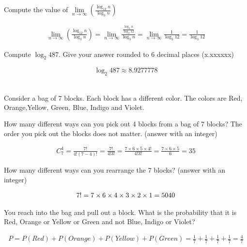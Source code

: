 \documentclass[12pt]{article}
\newenvironment{sol}[1][Solution]{\begin{trivlist}
\item[\hskip\labelsep {\bfseries #1:}]}{\end{trivlist}}
\begin{document}
\begin{enumerate}
    \item Compute the value of $\lim\limits_{n \to \infty}(\frac{\log_{12}n}{\log_3n})$
    \begin{sol}
        \begin{align*}
            \lim\limits_{n \to \infty}(\frac{\log_{12}n}{\log_3n})
            = \lim\limits_{n \to \infty}\frac{\frac{\log_3n}{\log_3 12}}{\log_3 n}
            = \lim_{n \to \infty}\frac{1}{\log_3 12} = \frac{1}{\log_3 12}
        \end{align*}
    \end{sol}

    \item Compute $\log_2 487$. Give your answer rounded to 6 decimal places (x.xxxxxx)
    \begin{sol}
        \begin{align*}
        \log_{2}487 \approx 8.9277778
        \end{align*}
    \end{sol}

~\\

Consider a bag of 7 blocks. Each block has a different color. The colors are Red, Orange,Yellow, Green, Blue, Indigo and Violet.

    \item How many different ways can you pick out 4 blocks from a bag of 7 blocks? The order you pick out the blocks does not matter. (answer with an integer)
    \begin{sol}
        \begin{align*}
            C_7^4 = \frac{7!}{4!(7-4)!} = \frac{7!}{4!3!}=\frac{7\times 6\times 5\times 4!}{4! 3!}=\frac{7\times6\times5}{6} = 35 
        \end{align*}
    \end{sol}

    \item How many different ways can you rearrange the 7 blocks? (answer with an integer)
    \begin{sol}
        \begin{align*}
            7!=7\times6\time5\times4\times3\times2\times1 = 5040
        \end{align*}
    \end{sol}

    \item You reach into the bag and pull out a block. What is the probability that it is Red, Orange or Yellow or Green and not Blue, Indigo or Violet?
    \begin{sol}
        \begin{align*}
            P=P(Red)+P(Orange)+P(Yellow)+P(Green)=\frac{1}{7} + \frac{1}{7} + \frac{1}{7} +\frac{1}{7} = \frac{4}{7}
        \end{align*}
    \end{sol}


\end{enumerate}
\end{document}
